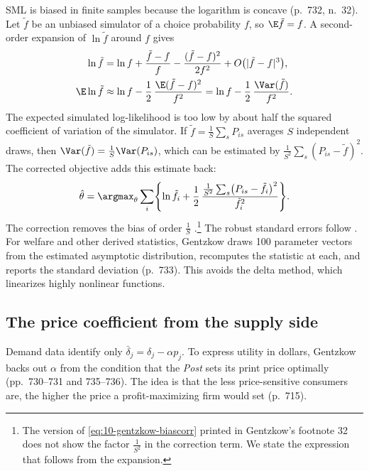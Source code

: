  SML is biased in finite samples because the logarithm is concave (p.~732, n.~32). Let
$\tilde f$ be an unbiased simulator of a choice probability $f$, so $\E\tilde f = f$. A second-order expansion of $\ln
\tilde f$ around $f$ gives
\begin{align*}
  \ln\tilde f &= \ln f + \frac{\tilde f - f}{f} - \frac{(\tilde f - f)^2}{2f^2} + O\bigl(|\tilde f - f|^3\bigr), \\
  \E\ln\tilde f &\approx \ln f - \frac{1}{2}\,\frac{\E(\tilde f - f)^2}{f^2} = \ln f - \frac{1}{2}\,\frac{\Var(\tilde f)}{f^2} .
\end{align*}
The expected simulated log-likelihood is too low by about half the squared coefficient of variation of the simulator.
If $\tilde f = \frac{1}{S}\sum_s P_{is}$ averages $S$ independent draws, then $\Var(\tilde f) = \frac{1}{S}\Var(P_{is})$,
which can be estimated by $\frac{1}{S^2}\sum_s(P_{is} - \tilde f)^2$. The corrected objective adds this estimate back:
\begin{equation}\label{eq:10-gentzkow-biascorr}
  \hat\theta = \argmax_\theta\sum_i\Biggl\{\ln\tilde f_i + \frac{1}{2}\,
  \frac{\frac{1}{S^2}\sum_{s}\bigl(P_{is} - \tilde f_i\bigr)^2}{\tilde f_i^2}\Biggr\} .
\end{equation}
The correction removes the bias of order $\frac{1}{S}$ \citep[p.~45]{GourierouxMonfort1996}.\footnote{The version of
\eqref{eq:10-gentzkow-biascorr} printed in Gentzkow's footnote 32 does not show the factor $\frac{1}{S^2}$ in the
correction term. We state the expression that follows from the expansion.} The robust standard errors follow
\citet{McFaddenTrain2000}. For welfare and other derived statistics, Gentzkow draws 100 parameter vectors from the
estimated asymptotic distribution, recomputes the statistic at each, and reports the standard deviation (p.~733). This
avoids the delta method, which linearizes highly nonlinear functions.

\subsection{The price coefficient from the supply side}\label{sec:10-gentzkow-supply}

Demand data identify only $\bar\delta_j = \delta_j - \alpha p_j$. To express utility in dollars, Gentzkow backs out
$\alpha$ from the condition that the \textit{Post} sets its print price optimally (pp.~730--731 and 735--736). The idea
is that the less price-sensitive consumers are, the higher the price a profit-maximizing firm would set (p.~715).

